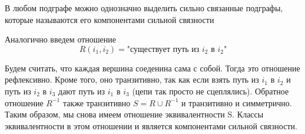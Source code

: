 \documentclass[discrete.tex]{subfiles}
\begin{document}
  \begin{remark}
    В любом подграфе можно однозначно выделить сильно связанные подграфы, которые называются его компонентами сильной связности
  \end{remark}

  \begin{definition}
    Аналогично введем отношение
    \[R(i_1,i_2) = \text{"существует путь из $i_2$ в $i_2$"}\]
  \end{definition}

  \begin{remark}
    Будем считать, что каждая вершина соеденина сама с собой. Тогда это отношение рефлексивно. Кроме того, оно транзитивно, так как если взять путь из $i_1$ в $i_2$ и путь из $i_2$ в $i_3$ дают путь из $i_1$ в $i_3$ (цепи так просто не сцеплялись). Обратное отношение $R^{-1}$ также транзитивно $S=R \cup R^{-1}$ и транзитивно и симметрично. Таким образом, мы снова имеем отношение эквивалентности S. Классы эквивалентности в этом отношении и является компонентами сильной связности.
  \end{remark}
\end{document}
